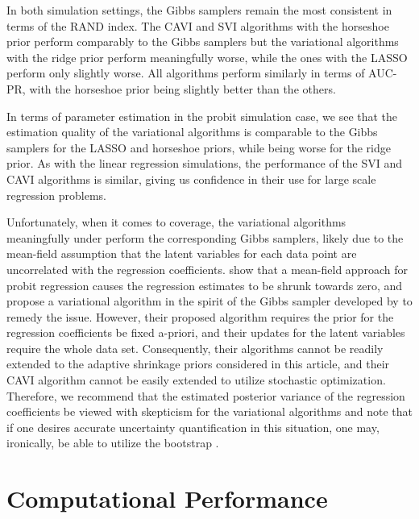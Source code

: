 \documentclass[]{article}
\begin{document}
In both simulation settings, the Gibbs samplers remain the most consistent in
terms of the RAND index. The CAVI and SVI algorithms with the horseshoe prior
perform comparably to the Gibbs samplers but the variational algorithms with the
ridge prior perform meaningfully worse, while the ones with the LASSO perform
only slightly worse. All algorithms perform similarly in terms of AUC-PR, with
the horseshoe prior being slightly better than the others.

In terms of parameter estimation in the probit simulation case, we see that the
estimation quality of the variational algorithms is comparable to the Gibbs
samplers for the LASSO and horseshoe priors, while being worse for the ridge
prior. As with the linear regression simulations, the performance of the SVI and
CAVI algorithms is similar, giving us confidence in their use for large scale
regression problems. 

Unfortunately, when it comes to coverage, the variational algorithms
meaningfully under perform the corresponding Gibbs samplers, likely due to the
mean-field assumption that the latent variables for each data point are
uncorrelated with the regression coefficients.  \citet{fasano2019scalable} show
that a mean-field approach for probit regression causes the regression estimates
to be shrunk towards zero, and propose a variational algorithm in the spirit of
the Gibbs sampler developed by \citet{holmes2006bayesian} to remedy the issue.
However, their proposed algorithm requires the prior for the regression
coefficients be fixed a-priori, and their updates for the latent variables
require the whole data set. Consequently, their algorithms cannot be readily
extended to the adaptive shrinkage priors considered in this article, and their
CAVI algorithm cannot be easily extended to utilize stochastic optimization.
Therefore, we recommend that the estimated posterior variance of the regression
coefficients be viewed with skepticism for the variational algorithms and note
that if one desires accurate uncertainty quantification in this situation, one
may, ironically, be able to utilize the bootstrap \citep{chen2018use}.

\section{Computational Performance} \label{sec:vir:timing}
\end{document}
